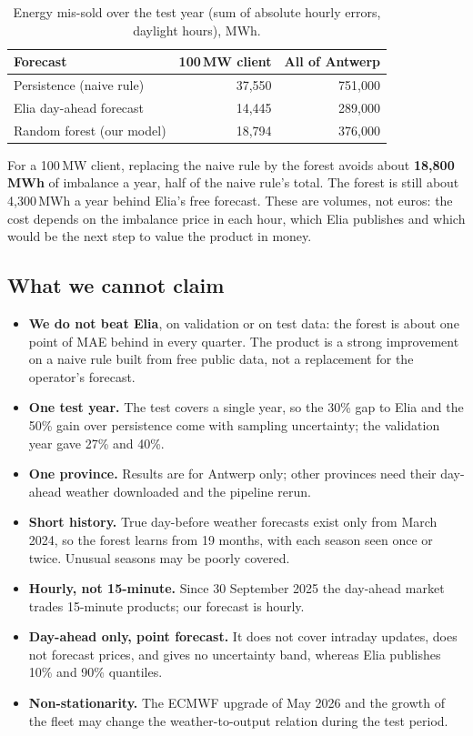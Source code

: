 \documentclass[11pt,a4paper]{article}
\begin{document}
\begin{table}[ht]
\centering\small
\caption{Energy mis-sold over the test year (sum of absolute hourly errors, daylight hours), MWh.}
\label{tab:value}
\begin{tabular}{@{}l r r@{}}
\toprule
Forecast & 100\,MW client & All of Antwerp \\
\midrule
Persistence (naive rule)  & 37,550 & 751,000 \\
Elia day-ahead forecast   & 14,445 & 289,000 \\
Random forest (our model) & 18,794 & 376,000 \\
\bottomrule
\end{tabular}
\end{table}

For a 100\,MW client, replacing the naive rule by the forest avoids about \textbf{18,800\,MWh} of
imbalance a year, half of the naive rule's total. The forest is still about 4,300\,MWh a year behind
Elia's free forecast. These are volumes, not euros: the cost depends on the imbalance price in each
hour, which Elia publishes and which would be the next step to value the product in money.

\subsection{What we cannot claim}

\begin{itemize}
  \item \textbf{We do not beat Elia}, on validation or on test data: the forest is about one point of
  MAE behind in every quarter. The product is a strong improvement on a naive rule built from free
  public data, not a replacement for the operator's forecast.
  \item \textbf{One test year.} The test covers a single year, so the 30\% gap to Elia and the 50\%
  gain over persistence come with sampling uncertainty; the validation year gave 27\% and 40\%.
  \item \textbf{One province.} Results are for Antwerp only; other provinces need their day-ahead
  weather downloaded and the pipeline rerun.
  \item \textbf{Short history.} True day-before weather forecasts exist only from March 2024, so the
  forest learns from 19 months, with each season seen once or twice. Unusual seasons may be poorly
  covered.
  \item \textbf{Hourly, not 15-minute.} Since 30 September 2025 the day-ahead market trades
  15-minute products; our forecast is hourly.
  \item \textbf{Day-ahead only, point forecast.} It does not cover intraday updates, does not
  forecast prices, and gives no uncertainty band, whereas Elia publishes 10\% and 90\% quantiles.
  \item \textbf{Non-stationarity.} The ECMWF upgrade of May 2026 and the growth of the fleet may
  change the weather-to-output relation during the test period.
\end{itemize}
\end{document}
